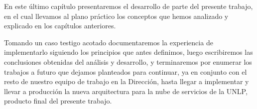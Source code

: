 En este último capítulo presentaremos el desarrollo de parte del presente trabajo, en el cual llevamos al plano práctico los conceptos que hemos analizado y explicado en los capítulos anteriores.

Tomando un caso testigo acotado documentaremos la experiencia de implementarlo siguiendo los principios que antes definimos, luego escribiremos las conclusiones obtenidas del análisis y desarrollo, y terminaremos por enumerar los trabajos a futuro que dejamos planteados para continuar, ya en conjunto con el resto de nuestro equipo de trabajo en la Dirección, hasta llegar a implementar y llevar a producción la nueva arquitectura para la nube de servicios de la UNLP, producto final del presente trabajo.
